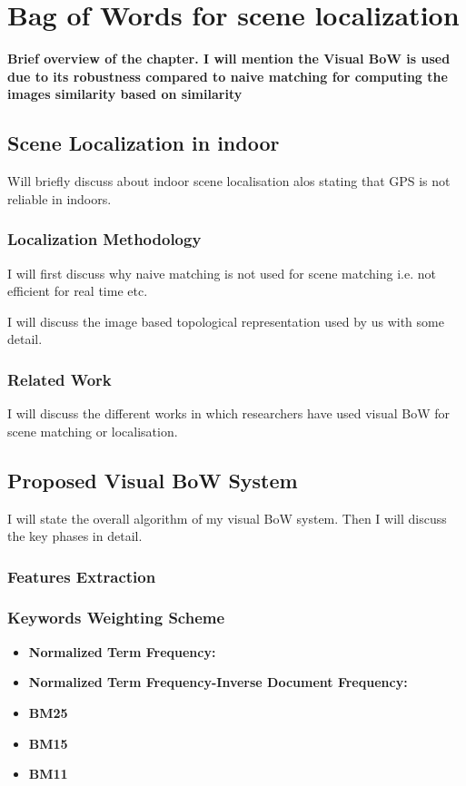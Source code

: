 \chapter{Bag of Words for scene localization}

\textbf{Brief overview of the chapter.
I will mention the Visual BoW is used due to its robustness 
compared to naive matching for computing the images similarity 
based on similarity}

\section{Scene Localization in indoor} 
Will briefly discuss about indoor scene localisation 
alos stating that GPS is not reliable in indoors. 


\subsection{Localization Methodology}
I will first discuss why naive matching is not used 
for scene matching i.e. not efficient for 
real time etc. 

I will discuss the image based 
topological representation used by us 
with some detail.

\subsection{Related Work}
I will discuss the different works in which 
researchers have used visual BoW 
for scene matching or localisation.

\section{Proposed Visual BoW System}
I will state the overall algorithm of 
my visual BoW system. 
Then I will discuss the 
key phases in detail.

\subsection{Features Extraction}
\subsection{Keywords Weighting Scheme}
\begin{itemize}

\item \textbf{Normalized Term Frequency:}
\item \textbf{Normalized Term Frequency-Inverse Document Frequency:}

\item {\textbf{BM25}}
\item {\textbf{BM15}}
\item {\textbf{BM11}}

\end{itemize}

